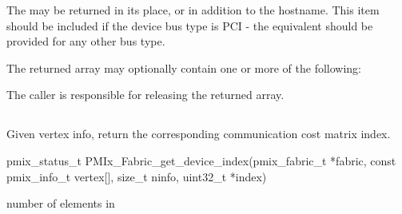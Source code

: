 \reqattrstart
{} The  may be returned in its place, or in addition to the hostname.
\pastePRIAttributeItemEnd
{}
 This item should be included if the device bus type is \ac{PCI} - the equivalent should be provided for any other bus type.
\pastePRIAttributeItemEnd

\reqattrend

The returned array may optionally contain one or more of the following:

\optattrstart
{}
\optattrend

The caller is responsible for releasing the returned array.



\subsection{}

\summary

Given vertex info, return the corresponding communication cost matrix index.

\format

\cspecificstart
\begin{codepar}
pmix_status_t
PMIx_Fabric_get_device_index(pmix_fabric_t *fabric,
                      const pmix_info_t vertex[], size_t ninfo,
                      uint32_t *index)
\end{codepar}
\cspecificend

\begin{arglist}
 number of elements in 
\end{arglist}


